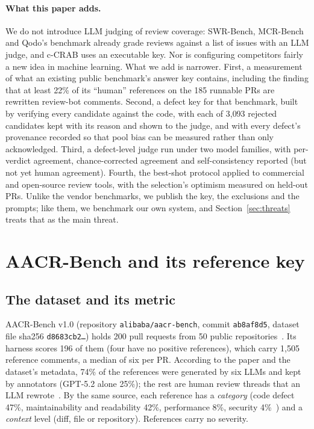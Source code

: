 \documentclass[11pt,a4paper]{article}
\newcommand{\code}[1]{\texttt{#1}}
\begin{document}
\paragraph{What this paper adds.} We do not introduce LLM judging of review
coverage: SWR-Bench, MCR-Bench and Qodo's benchmark already grade reviews
against a list of issues with an LLM judge, and c-CRAB uses an executable key.
Nor is configuring competitors fairly a new idea in machine learning. What we
add is narrower. First, a measurement of what an existing public benchmark's
answer key contains, including the finding that at least 22\% of its
``human'' references on the 185 runnable PRs are rewritten review-bot
comments. Second, a defect key for that benchmark, built by verifying every
candidate against the code, with each of 3{,}093 rejected candidates kept with
its reason and shown to the judge, and with every defect's provenance recorded
so that pool bias can be measured rather than only acknowledged. Third, a
defect-level judge run under two model families, with per-verdict agreement,
chance-corrected agreement and self-consistency reported (but not yet
human agreement). Fourth, the best-shot protocol applied to commercial and
open-source review tools, with the selection's optimism measured on held-out
PRs. Unlike the vendor benchmarks, we publish the key, the exclusions and the
prompts; like them, we benchmark our own system, and Section~\ref{sec:threats}
treats that as the main threat.


\section{AACR-Bench and its reference key}
\label{sec:aacr}

\subsection{The dataset and its metric}

AACR-Bench v1.0 (repository \code{alibaba/aacr-bench}, commit
\code{ab8af8d5}, dataset file sha256 \code{d8683cb2\ldots}) holds 200
pull requests from 50 public repositories~\cite{aacrbench}. Its harness
scores 196 of them (four have no positive references), which carry 1{,}505
reference comments, a median of six per PR. According to the paper and the
dataset's metadata, 74\% of the references were generated by six LLMs and
kept by annotators (GPT-5.2 alone 25\%); the rest are human review threads
that an LLM rewrote~\cite{aacrbench}. By the same source, each reference has a
\emph{category} (code defect 47\%, maintainability and readability 42\%,
performance 8\%, security 4\%~\cite{aacrbench}) and a \emph{context} level
(diff, file or repository).
References carry no severity.
\end{document}
